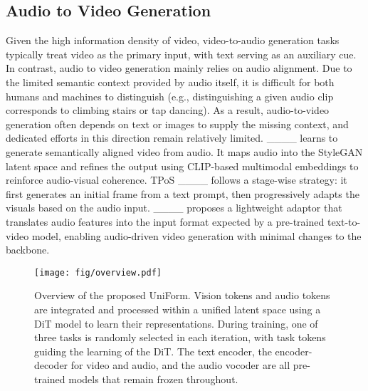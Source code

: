 \subsection{Audio to Video Generation}
Given the high information density of video, video-to-audio generation tasks typically treat video as the primary input, with text serving as an auxiliary cue. In contrast, audio to video generation mainly relies on audio alignment. Due to the limited semantic context provided by audio itself, it is difficult for both humans and machines to distinguish (e.g., distinguishing a given audio clip corresponds to climbing stairs or tap dancing). As a result, audio-to-video generation often depends on text or images to supply the missing context, and dedicated efforts in this direction remain relatively limited. ____ learns to generate semantically aligned video from audio. It maps audio into the StyleGAN latent space and refines the output using CLIP-based multimodal embeddings to reinforce audio-visual coherence. TPoS ____ follows a stage-wise strategy: it first generates an initial frame from a text prompt, then progressively adapts the visuals based on the audio input. ____ proposes a lightweight adaptor that translates audio features into the input format expected by a pre-trained text-to-video model, enabling audio-driven video generation with minimal changes to the backbone.

\begin{figure*}[t]
    \centering
    \texttt{[image: fig/overview.pdf]}
    \caption{Overview of the proposed UniForm. Vision tokens and audio tokens are integrated and processed within a unified latent space using a DiT model to learn their representations. During training, one of three tasks is randomly selected in each iteration, with task tokens guiding the learning of the DiT. The text encoder, the encoder-decoder for video and audio, and the audio vocoder are all pre-trained models that remain frozen throughout.}
    \label{fig:overview}
\end{figure*}
